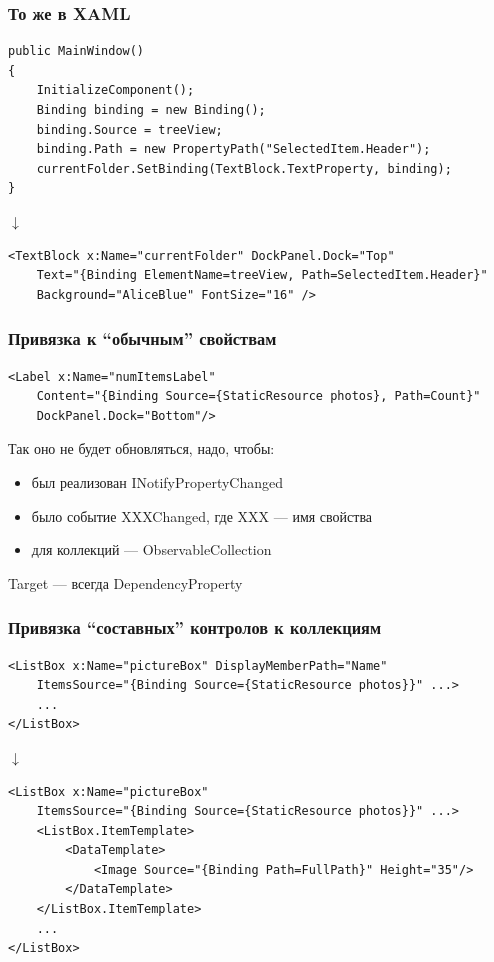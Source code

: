 \documentclass[xetex,mathserif,serif]{beamer}
\newcommand{\DownArrow} {
	\hspace{2cm}\begin{LARGE}$\downarrow$\end{LARGE}
}
\begin{document}
	\begin{frame}[fragile]
		\frametitle{То же в XAML}
		\begin{footnotesize}
			\begin{verbatim}
public MainWindow()
{
    InitializeComponent();
    Binding binding = new Binding();
    binding.Source = treeView;
    binding.Path = new PropertyPath("SelectedItem.Header");
    currentFolder.SetBinding(TextBlock.TextProperty, binding);
}
			\end{verbatim}
		\end{footnotesize}
		\DownArrow
		\begin{footnotesize}
			\begin{verbatim}
<TextBlock x:Name="currentFolder" DockPanel.Dock="Top"
    Text="{Binding ElementName=treeView, Path=SelectedItem.Header}"
    Background="AliceBlue" FontSize="16" />
			\end{verbatim}
		\end{footnotesize}
	\end{frame}

	\begin{frame}[fragile]
		\frametitle{Привязка к ``обычным'' свойствам}
		\begin{footnotesize}
			\begin{verbatim}
<Label x:Name="numItemsLabel"
    Content="{Binding Source={StaticResource photos}, Path=Count}"
    DockPanel.Dock="Bottom"/>
			\end{verbatim}
		\end{footnotesize}
		Так оно не будет обновляться, надо, чтобы:
		\begin{itemize}
			\item был реализован INotifyPropertyChanged
			\item было событие XXXChanged, где XXX --- имя свойства
			\item для коллекций --- ObservableCollection
		\end{itemize}
		Target --- всегда DependencyProperty
	\end{frame}

	\begin{frame}[fragile]
		\frametitle{Привязка ``составных'' контролов к коллекциям}
		\begin{footnotesize}
			\begin{verbatim}
<ListBox x:Name="pictureBox" DisplayMemberPath="Name"
    ItemsSource="{Binding Source={StaticResource photos}}" ...>
    ...
</ListBox>
			\end{verbatim}
		\end{footnotesize}
		\DownArrow
		\begin{footnotesize}
			\begin{verbatim}
<ListBox x:Name="pictureBox"
    ItemsSource="{Binding Source={StaticResource photos}}" ...>
    <ListBox.ItemTemplate>
        <DataTemplate>
            <Image Source="{Binding Path=FullPath}" Height="35"/>
        </DataTemplate>
    </ListBox.ItemTemplate>
    ...
</ListBox>
			\end{verbatim}
		\end{footnotesize}
	\end{frame}
\end{document}
